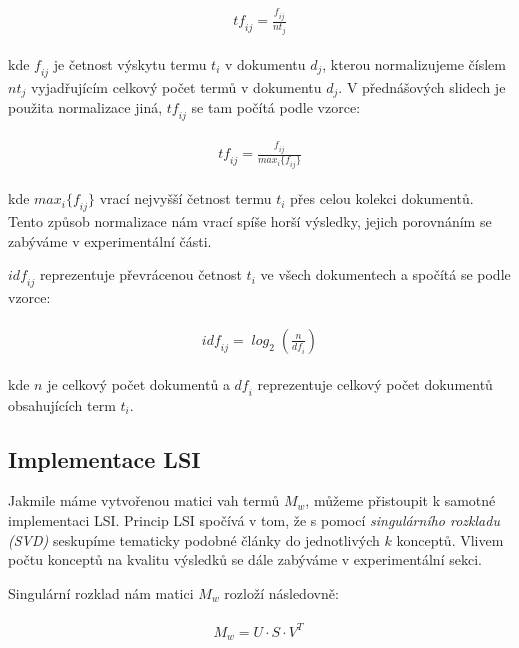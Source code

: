 \documentclass[11pt]{scrartcl} %
\begin{document}
\begin{align}
	\begin{split}
		\mathit{tf_{ij} = \frac{f_{ij}}{nt_j}}
	\end{split}					
\end{align}

kde $\mathit{f_{ij}}$ je četnost výskytu termu $t_i$ v dokumentu $d_j$, kterou normalizujeme číslem $\mathit{nt_j}$ vyjadřujícím celkový počet termů v dokumentu $d_j$. V přednášových slidech je použita normalizace jiná, $\mathit{tf_{ij}}$ se tam počítá podle vzorce:

\begin{align}
	\begin{split}
		\mathit{tf_{ij} = \frac{f_{ij}}{max_i\{f_{ij}\}}}
	\end{split}					
\end{align}

kde $\mathit{max_i\{f_{ij}\}}$ vrací nejvyšší četnost termu $t_i$ přes celou kolekci dokumentů. Tento způsob normalizace nám vrací spíše horší výsledky, jejich porovnáním se zabýváme v experimentální části.

$\mathit{idf_{ij}}$ reprezentuje převrácenou četnost $t_i$ ve všech dokumentech a spočítá se podle vzorce:

\begin{align}
	\begin{split}
		\mathit{idf_{ij} = \log_2 (\frac{n}{df_i})}
	\end{split}					
\end{align}

kde $n$ je celkový počet dokumentů a $\mathit{df_i}$ reprezentuje celkový počet dokumentů obsahujících term $t_i$.

\subsection{Implementace LSI}

Jakmile máme vytvořenou matici vah termů $M_w$, můžeme přistoupit k samotné implementaci LSI. Princip LSI spočívá v tom, že s pomocí \emph{singulárního rozkladu (SVD)} seskupíme tematicky podobné články do jednotlivých $k$ konceptů. Vlivem počtu konceptů na kvalitu výsledků se dále zabýváme v experimentální sekci.

\bigskip 

Singulární rozklad nám matici $M_w$ rozloží následovně:

\begin{align}
	\begin{split}
		M_w = U \cdot S \cdot V^T
	\end{split}					
\label{eq:svd}\
\end{align}
\end{document}
